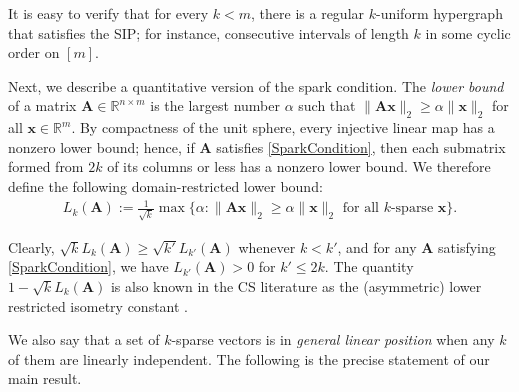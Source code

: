 \documentclass[9pt,twocolumn]{pnas-new}
\newtheorem{proposition}{Proposition}
\begin{document}
It is easy to verify that for every $k < m$, there is a regular $k$-uniform hypergraph that satisfies the SIP; for instance, consecutive intervals of length $k$ in some cyclic order on $[m]$.

Next, we describe a quantitative version of the spark condition.  %
The \emph{lower bound} \cite{Grcar10} of a matrix $\mathbf{A} \in \mathbb R^{n \times m}$ is the largest number $\alpha$ such that \mbox{$\|\mathbf{A}\mathbf{x}\|_2 \geq \alpha\|\mathbf{x}\|_2$} for all $\mathbf{x} \in \mathbb{R}^m$. By compactness of the unit sphere, every injective linear map has a nonzero lower bound; hence, if $\mathbf{A}$ satisfies \eqref{SparkCondition}, then each submatrix formed from $2k$ of its columns or less has a nonzero lower bound. We therefore define the following domain-restricted lower bound:
\begin{align*}
L_k(\mathbf{A}) := \frac{1}{\sqrt{k}}\max \{ \alpha : \|\mathbf{A}\mathbf{x}\|_2 \geq \alpha\|\mathbf{x}\|_2 \text{ for all $k$-sparse } \mathbf{x}\}.
\end{align*} 

Clearly, $\sqrt{k} L_k(\mathbf{A}) \geq \sqrt{k'}L_{k'}(\mathbf{A})$ whenever $k < k'$, and for any $\mathbf{A}$ satisfying \eqref{SparkCondition}, we have $L_{k'}(\mathbf{A}) > 0$ for  $k' \leq 2k$. The quantity $1 - \sqrt{k} L_k(\mathbf{A})$ is also known in the CS literature as the (asymmetric) lower restricted isometry constant \cite{Blanchard2011, Foucart2009}.

We also say that a set of $k$-sparse vectors is in \emph{general linear position} when any $k$ of them are linearly independent.
The following is the precise statement of our main result. 
\end{document}
